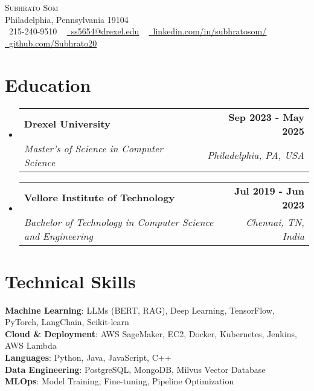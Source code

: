 \documentclass[letterpaper,11pt]{article}
\makeatletter
\newcommand{\resumeSubheading}[4]{
  \vspace{-2pt}\item
    \begin{tabular*}{1.0\textwidth}[t]{l@{\extracolsep{\fill}}r}
      \textbf{#1} & \textbf{\small #2} \\
      \textit{\small#3} & \textit{\small #4} \\
    \end{tabular*}\vspace{-7pt}
}
\newcommand{\resumeSubHeadingListStart}{\begin{itemize}[leftmargin=0.0in, label={}]}
\newcommand{\resumeSubHeadingListEnd}{\end{itemize}}
\makeatother
\begin{document}

\vspace{-16pt}
\begin{center}
    {\Huge \scshape Subhrato Som} \\ \vspace{1pt}
    Philadelphia, Pennsylvania 19104 \\ \vspace{1pt}
    \small \raisebox{-0.1\height}\faPhone\ 215-240-9510 ~ \href{mailto:ss5654@drexel.edu}{\raisebox{-0.2\height}\faEnvelope\  \underline{ss5654@drexel.edu}} ~ 
    \href{https://linkedin.com/in/subhratosom/}{\raisebox{-0.2\height}\faLinkedin\ \underline{linkedin.com/in/subhratosom/}}  ~
    \href{https://github.com/Subhrato20}{\raisebox{-0.2\height}\faGithub\ \underline{github.com/Subhrato20}}
    \vspace{-8pt}
\end{center}

\section{Education}
  \resumeSubHeadingListStart
  
    \resumeSubheading
      {Drexel University}{Sep 2023 - May 2025}
      {Master's of Science in Computer Science}{Philadelphia, PA, USA}

    \vspace{-5pt}
    \resumeSubheading
      {Vellore Institute of Technology}{Jul 2019 - Jun 2023}
      {Bachelor of Technology in Computer Science and Engineering}{Chennai, TN, India}

  
  \resumeSubHeadingListEnd
\vspace{-15pt}

\section{Technical Skills}

\begin{itemize}[leftmargin=0.15in, label={}]
	\small{\item{
		\textbf{Machine Learning}{: LLMs (BERT, RAG), Deep Learning, TensorFlow, PyTorch, LangChain, Scikit-learn} \\
		\textbf{Cloud \& Deployment}{: AWS SageMaker, EC2, Docker, Kubernetes, Jenkins, AWS Lambda} \\
		\textbf{Languages}{: Python, Java, JavaScript, C++} \\
		\textbf{Data Engineering}{: PostgreSQL, MongoDB, Milvus Vector Database} \\
		\textbf{MLOps}{: Model Training, Fine-tuning, Pipeline Optimization} 
	}}
\end{itemize}
\vspace{-18pt}
\end{document}
